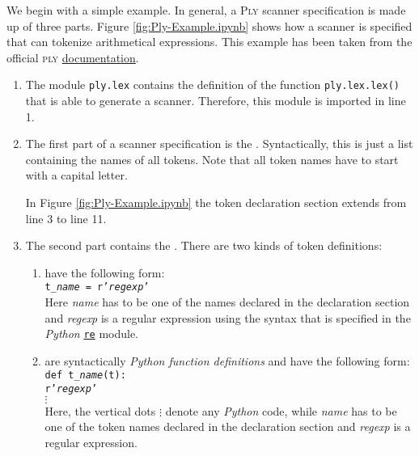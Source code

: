 We begin with a simple example.  In general, a \textsc{Ply} scanner specification is made up of three parts.
Figure \ref{fig:Ply-Example.ipynb} shows how a scanner is specified that can tokenize arithmetical expressions.
This example has been taken from the official \textsc{ply}
\href{https://ply.readthedocs.io/en/latest/ply.html#specification-of-tokens}{documentation}. 
\begin{enumerate}
\item The module \texttt{ply.lex} contains the definition of the function \texttt{ply.lex.lex()}
      that is able to generate a scanner.
      Therefore, this module is imported in line 1.
\item The first part of a scanner specification is the .
      Syntactically, this is just a list containing the names of all tokens.  Note that all token names have to
      start with a capital 
      letter.

      In Figure \ref{fig:Ply-Example.ipynb} the token declaration section extends from line 3 to line 11.
\item The second part contains the .  There are two kinds of token definitions:
      \begin{enumerate}
      \item {}  have the following form:
            \\[0.2cm]
            \hspace*{1.3cm}
            \texttt{t\_\textsl{name} = r'\textsl{regexp}'}
            \\[0.2cm]
            Here \textsl{name} has to be one of the names declared in the declaration section and
            \textsl{regexp} is a regular expression using the syntax that is specified in the 
            \textsl{Python} \href{https://docs.python.org/3/library/re.html}{\texttt{re}} module.
      \item {}  are syntactically
            \textsl{Python function definitions} and have the following form:
            \\[0.2cm]
            \hspace*{1.3cm}
            \texttt{def t\_\textsl{name}(t):} \\
            \hspace*{2.05cm}
            \texttt{r'\textsl{regexp}'} \\
            \hspace*{2.8cm} $\vdots$ \\[0.2cm]
            Here, the vertical dots $\vdots$ denote any \textsl{Python} code, while
            \textsl{name} has to be one of the token names declared in the declaration section and
            \textsl{regexp} is a regular expression.
            

\end{enumerate}
\end{enumerate}
